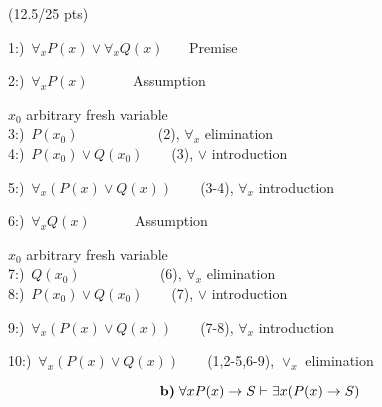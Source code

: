 \documentclass[a4paper,12pt]{article}
\begin{document}
\hfill \small{(12.5/25 pts)}\\
\begin{tcolorbox}
\begin{center}
1:)\, $\forall_x P(x) \vee \forall_x Q(x)  $\,\,\,\,\,\,\,\,\, Premise
\begin{tcolorbox}
\begin{center}
 2:)\, $\forall_x P(x)  $\,\,\,\,\,\,\,\,\,\,\,\,\,\,\,\,\, Assumption \\
    \begin{tcolorbox}
    \begin{center}
    $x_0$ arbitrary fresh variable \,\,\,\,\,\,\,\,\,\,\,\,\,\,\,\,\,\,\,\,\,\,\,\,\,\,\,\,\,\,\,\,\,\,\,\,\,\,\,\,\, \\
    3:)\, $P(x_0) $        \,\,\,\,\,\,\,\,\,\,\,\,\,\,\,\,\,\,\,\,\,\,\,\,\,\,\,\,\,\, (2), $\forall_x$ elimination   \\
    4:)\, $ P(x_0) \vee Q(x_0)  $ \,\,\,\,\,\,\,\, (3), $\vee $ introduction \\
    \end{center}
    \end{tcolorbox}
    5:)\, $\forall_x( P(x) \vee Q(x))  $\,\,\,\,\,\,\,\,\,\, (3-4), $\forall_x$ introduction  \\
\end{center}
\end{tcolorbox}
\begin{tcolorbox}
\begin{center}
 6:)\, $\forall_x Q(x)  $\,\,\,\,\,\,\,\,\,\,\,\,\,\,\,\,\, Assumption
    \begin{tcolorbox}
    \begin{center}
    $x_0$ arbitrary fresh variable \,\,\,\,\,\,\,\,\,\,\,\,\,\,\,\,\,\,\,\,\,\,\,\,\,\,\,\,\,\,\,\,\,\,\,\,\,\,\,\,\, \\
    7:)\, $Q(x_0) $   \,\,\,\,\,\,\,\,\,\,\,\,\,\,\,\,\,\,\,\,\,\,\,\,\,\,\,\,\,\,  (6), $\forall_x$ elimination   \\
    8:)\, $ P(x_0) \vee Q(x_0)  $ \,\,\,\,\,\,\,\, (7), $\vee $ introduction \\
    \end{center}
    \end{tcolorbox}
    9:)\, $\forall_x( P(x) \vee Q(x))  $\,\,\,\,\,\,\,\,\,\, (7-8), $\forall_x$ introduction  \\
\end{center}
\end{tcolorbox}
10:)\, $\forall_x( P(x) \vee Q(x))  $\,\,\,\,\,\,\,\,\,\, (1,2-5,6-9), $\vee_x$ elimination  \\
\end{center}

\end{tcolorbox}
\newpage
\begin{equation*}
    \textbf{b)} \; \forall x P(x) \rightarrow S \vdash \exists x (P(x)\rightarrow S)\\
\end{equation*}
\end{document}
